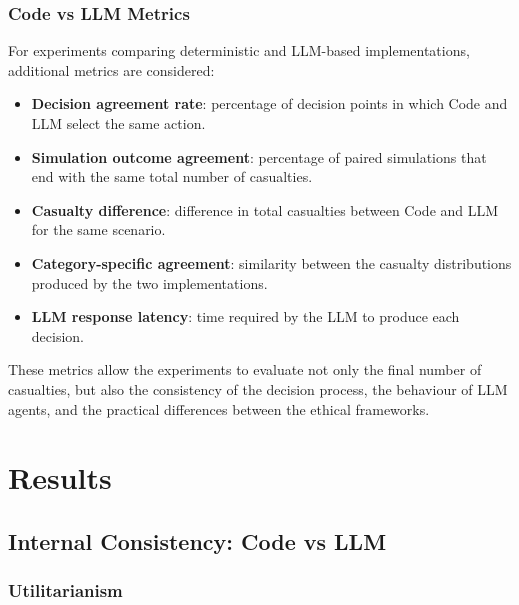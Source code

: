 \documentclass[10pt,a4paper]{article}
\begin{document}
\subsubsection{Code vs LLM Metrics}

For experiments comparing deterministic and LLM-based implementations,
additional metrics are considered:

\begin{itemize}

    \item \textbf{Decision agreement rate}: percentage of decision points
    in which Code and LLM select the same action.

    \item \textbf{Simulation outcome agreement}: percentage of paired
    simulations that end with the same total number of casualties.

    \item \textbf{Casualty difference}: difference in total casualties
    between Code and LLM for the same scenario.

    \item \textbf{Category-specific agreement}: similarity between the
    casualty distributions produced by the two implementations.

    \item \textbf{LLM response latency}: time required by the LLM to
    produce each decision.

\end{itemize}

These metrics allow the experiments to evaluate not only the final
number of casualties, but also the consistency of the decision process,
the behaviour of LLM agents, and the practical differences between the
ethical frameworks.





\newpage
\section{Results}
\label{sec:results}

\subsection{Internal Consistency: Code vs LLM}

\subsubsection{Utilitarianism}
\end{document}
